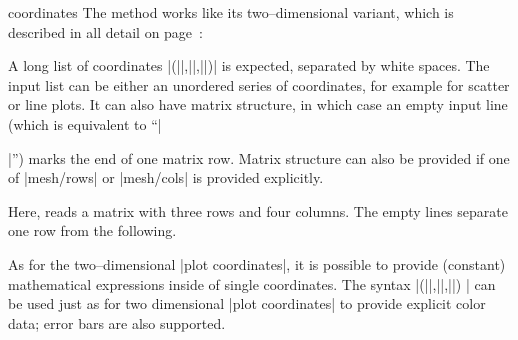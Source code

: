\begin{addplot3operation}[]{coordinates}{}
	The  method works like its two--dimensional variant,  which is described in all detail on page~\pageref{pgfplots:addplot:coordinates}:

	A long list of coordinates |(||,||,||)| is expected, separated by white spaces. The input list can be either an unordered series of coordinates, for example for scatter or line plots. It can also have matrix structure, in which case an empty input line (which is equivalent to ``|\par|'') marks the end of one matrix row. Matrix structure can also be provided if one of |mesh/rows| or |mesh/cols| is provided explicitly.
	
\long\def\temporarytest{\noexpand\par}
\begin{codeexample}[newline=\temporarytest]
\end{codeexample}
	\noindent Here,  reads a matrix with three rows and four columns. The empty lines separate one row from the following.

	As for the two--dimensional |plot coordinates|, it is possible to provide (constant) mathematical expressions inside of single coordinates. The syntax |(||,||,||) | can be used just as for two dimensional |plot coordinates| to provide explicit color data; error bars are also supported.
\end{addplot3operation}

